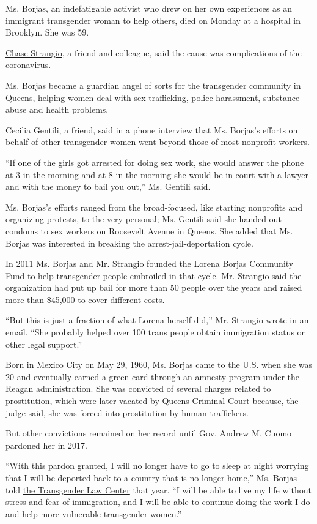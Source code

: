 Ms. Borjas, an indefatigable activist who drew on her own experiences as
an immigrant transgender woman to help others, died on Monday at a
hospital in Brooklyn. She was 59.

\href{https://www.aclu.org/news/by/chase-strangio/}{Chase Strangio}, a
friend and colleague, said the cause was complications of the
coronavirus.

Ms. Borjas became a guardian angel of sorts for the transgender
community in Queens, helping women deal with sex trafficking, police
harassment, substance abuse and health problems.

Cecilia Gentili, a friend, said in a phone interview that Ms. Borjas's
efforts on behalf of other transgender women went beyond those of most
nonprofit workers.

``If one of the girls got arrested for doing sex work, she would answer
the phone at 3 in the morning and at 8 in the morning she would be in
court with a lawyer and with the money to bail you out,'' Ms. Gentili
said.

Ms. Borjas's efforts ranged from the broad-focused, like starting
nonprofits and organizing protests, to the very personal; Ms. Gentili
said she handed out condoms to sex workers on Roosevelt Avenue in
Queens. She added that Ms. Borjas was interested in breaking the
arrest-jail-deportation cycle.

In 2011 Ms. Borjas and Mr. Strangio founded the
\href{https://www.facebook.com/lbcfny/}{Lorena Borjas Community Fund} to
help transgender people embroiled in that cycle. Mr. Strangio said the
organization had put up bail for more than 50 people over the years and
raised more than \$45,000 to cover different costs.

``But this is just a fraction of what Lorena herself did,'' Mr. Strangio
wrote in an email. ``She probably helped over 100 trans people obtain
immigration status or other legal support.''

Born in Mexico City on May 29, 1960, Ms. Borjas came to the U.S. when
she was 20 and eventually earned a green card through an amnesty program
under the Reagan administration. She was convicted of several charges
related to prostitution, which were later vacated by Queens Criminal
Court because, the judge said, she was forced into prostitution by human
traffickers.

But other convictions remained on her record until Gov. Andrew M. Cuomo
pardoned her in 2017.

``With this pardon granted, I will no longer have to go to sleep at
night worrying that I will be deported back to a country that is no
longer home,'' Ms. Borjas told
\href{https://transgenderlawcenter.org/archives/case/lorena-borjas}{the
Transgender Law Center} that year. ``I will be able to live my life
without stress and fear of immigration, and I will be able to continue
doing the work I do and help more vulnerable transgender women.''

